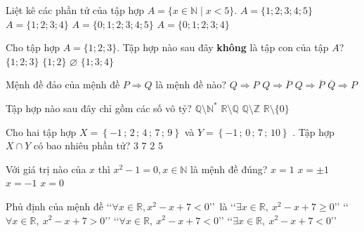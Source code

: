\begin{ex}%
Liệt kê các phần tử của tập hợp $A=\big\{ x \in \mathbb{N} \mid x<5\big\}$.
\choice
{$A=\big\{1;2;3;4;5\big\}$}
{$A=\big\{1;2;3;4\big\}$}
{$A=\big\{0;1;2;3;4;5\big\}$}
{\True $A=\big\{0;1;2;3;4\big\}$}
\end{ex}

\begin{ex}%
Cho tập hợp $A=\big\{1;2;3\big\}$. Tập hợp nào sau đây \textbf{không} là tập con của tập $A$?
\choice
{$\big\{1;2;3\big\}$}
{$\big\{1;2\big\}$}
{$\varnothing$}
{\True $\big\{1;3;4\big\}$}
\end{ex}

\begin{ex}%
Mệnh đề đảo của mệnh đề $P\Rightarrow Q$ là mệnh đề nào?
\choice
{\True $Q\Rightarrow P$}
{$Q\Rightarrow\overline{P}$}
{$Q\Rightarrow\overline{P}$}
{$\overline{Q}\Rightarrow P$}
\end{ex}

\begin{ex}%
Tập hợp nào sau đây chỉ gồm các số vô tỷ?
\choice
{$\mathbb{Q} \setminus \mathbb{N}^*$}
{\True $\mathbb{R} \setminus \mathbb{Q}$}
{$\mathbb{Q} \setminus \mathbb{Z}$}
{$\mathbb{R} \setminus \big\{0\big\}$}
\end{ex}

\begin{ex} %
Cho hai tập hợp $X = \left\{ { - 1\,;\,2\,;\,4\,;\,7\,;\,9} \right\}$  và $Y = \left\{ { - 1\,;\,0\,;\,7\,;\,10} \right\}$  . Tập hợp $X \cap Y$  có bao
nhiêu phần tử?
\choice
{ $ 3 $ }
{ $ 7 $ }
{\True $ 2 $ }
{ $ 5 $ }
\end{ex}

\begin{ex}%
Với giá trị nào của  $x$ thì $x^2-1=0, x \in \mathbb{N}$    là mệnh đề đúng?
\choice
{\True $x=1$ }
{$x=\pm 1$ }
{ $x=-1$}
{ $x=0$}
\end{ex}

\begin{ex}%
Phủ định của mệnh đề \lq \lq$\forall x\in \mathbb{R},{{x}^{2}}-x+7<0$\rq\rq \ là
\choice
{\True \lq \lq $\exists x\in \mathbb{R}, \ x^2-x+7\ge 0$\rq\rq }
{\lq \lq$\forall x\in \mathbb{R},\ x^2-x+7>0$\rq\rq }
{\lq \lq$\forall x\in \mathbb{R},\ x^2-x+7<0$\rq\rq }
{\lq \lq$ \exists x\in \mathbb{R},\ x^2-x+7<0$\rq\rq }
\end{ex}

